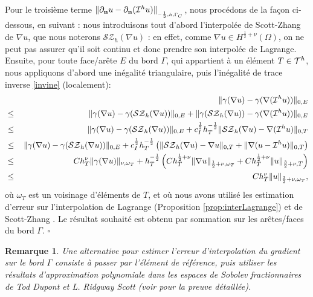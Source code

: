 \documentclass[11pt]{book}
\newtheorem{remark}[theorem]{Remarque}
\newcommand{\br}{\begin{remark}}
\newcommand{\er}{\end{remark}}
\newcommand{\cqfd}{{$\mbox{}$\hfill$\square$}}
\def\n{{\bf n}}
\newcommand{\caI}{{\cal I}}
\newcommand{\caT}{{\cal T}}
\newcommand{\SZ}{\mathcal{SZ}_h}
\newcommand{\Gc}{\Gamma_{C}}
\newcommand{\dnu}{\partial_{\n} u}
\newcommand{\nngc}[1]{\|{#1}\|_{_{-\frac12,h,\Gc}}}
\begin{document}
Pour le troisième terme $\nngc{ \dnu - \partial_\n (\caI^h u) }$, nous procédons de la façon ci-dessous, en suivant \cite[(2.18), p.11]{fritz-hueber-wohlmuth-03}: nous introduisons tout d'abord l'interpolée de Scott-Zhang de $\nabla u$, que nous noterons $\SZ (\nabla u)$ \cite{scott-zhang-90} : en effet, comme $\nabla u \in H^{\frac12+\nu} (\Omega)$, on ne peut pas assurer qu'il soit continu et donc prendre son interpolée de Lagrange.
Ensuite, pour toute face/arête $E$ du bord $\Gamma$, qui appartient à un élément $T \in \caT^h$, nous appliquons d'abord une inégalité triangulaire, puis l'inégalité de trace inverse \eqref{invine} (localement):
\begin{eqnarray*}
&& 
\| \gamma (\nabla u) - \gamma (\nabla (\caI^h u)) \|_{0,E} \\
&\leq\,& \| \gamma (\nabla u) - \gamma (\SZ (\nabla u)) \|_{0,E} + \| \gamma (\SZ (\nabla u)) - \gamma (\nabla (\caI^h u)) \|_{0,E} \\
&\leq\,& \| \gamma (\nabla u) - \gamma (\SZ (\nabla u)) \|_{0,E} + c_I^{\frac12} h_T^{-\frac12} \| \SZ (\nabla u) - \nabla (\caI^h u) \|_{0,T}\\
&\leq\,& \| \gamma (\nabla u) - \gamma (\SZ (\nabla u)) \|_{0,E} + c_I^{\frac12} h_T^{-\frac12} 
\left ( \| \SZ (\nabla u) - \nabla  u \|_{0,T} + \| \nabla ( u - \caI^h u) \|_{0,T}\right )\\
&\leq\,& C h_T^\nu \| \gamma (\nabla u) \|_{\nu,\omega_T} + h_T^{-\frac12} 
\left ( C h_T^{\frac12+\nu} \| \nabla u \|_{\frac12+\nu,\omega_T} + C h_T^{\frac12+\nu} \| u \|_{\frac32+\nu,T}\right ) \\
&\leq\,& C h_T^\nu \| u \|_{\frac32+\nu,\omega_T},
\end{eqnarray*}
où $\omega_T$ est un voisinage d'éléments de $T$, et où nous avons utilisé les estimation d'erreur sur l'interpolation de Lagrange (Proposition \ref{prop:interLagrange}) et de Scott-Zhang \cite{scott-zhang-90}.
Le résultat souhaité est obtenu par sommation sur les arêtes/faces du bord $\Gamma$.
%
\cqfd

\br Une alternative pour estimer l'erreur d'interpolation du gradient sur le bord $\Gamma$ consiste à passer par l'élément de référence, puis utiliser les résultats d'approximation polynomiale dans les espaces de Sobolev fractionnaires de Tod Dupont et L. Ridgway Scott \cite{dupont-scott-80} (voir \cite{chouly-hild-renard-13} pour la preuve détaillée). \er
\end{document}
